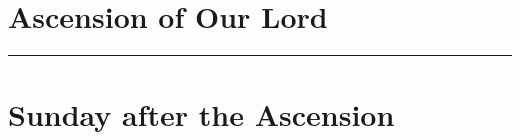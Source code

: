 {{
\section{Ascension of Our Lord}
\label{ascension}
\subtitle{ Class, White or Gold}
\subtitle{I \& II Vespers}

\def\deusinadjutoriumsolemn{T}
\def\postpsalmtitlethree{\needspace{18\baselineskip}}
\def\prepsalmthreeverses{}
\def\preantfive{\needspace{12\baselineskip}}
\def\prevr{\needspace{12\baselineskip}}
\def\premagnificat{\oldneedspace{7\baselineskip}}
\def\premagverses{\greseteolcustos{manual}\oldneedspace{18\baselineskip}}
\def\begincollectcols{%
\begin{parcolumns}[rulebetween,colwidths={1=0.46\linewidth}]{2}}
\def\definevesperspropers{
    \def\prepsalmfive{\greseteolcustos{manual}}
}
\def\definevesperspropersalt{
}
\def\vesperspropersnote{At II Vespers:}
\def\vesperspropersaltnote{At I Vespers:}
\let\printhymnnote=\undefined
\def\hymnlabel{hymn-salutishumanaesator}
\def\prevr{\bigskip{}
\emph{On the Sunday after the Ascension, \emph{\Vbar{}~Dóminus in cælo}, p.~\pageref{vr-sundayafterascension}}.

\bigskip}

\def\commemorations{If today is April 30 or May 1, \emph{First Vespers of St Joseph the Worker} is commemorated as on page \pageref{stjoseph-worker-commem}.}
\printcommemnote[1]{}
\bigskip
\hrule
}

{
\section{Sunday after the Ascension}
\label{easter6}\label{sundayafterascension}
\printcommonvespers{}
\renewcommand{\printhymnnote}{
    \medskip
    \noindent\printnote{Hymn.~\emph{Salútis humánæ Sator}, page \pageref{hymn-salutishumanaesator}.}
    \medskip
    \def\vrlinebreak{T}
    \label{vr-sundayafterascension}
    \printvr[\greseteolcustos{manual}]{\vrtex}{\vtranslation}{\rtranslation}
}
\def\precollect{\printvrdominusincaelo}
\def\premagtitle{\bigskip\bigskip}
\def\postmagtitle{\label{easter6-mag}\label{sundayafterascension-mag}}
\benedicamusdomino{}
}
}